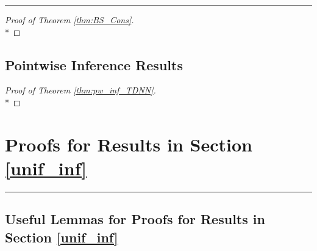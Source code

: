 \documentclass[letterpaper,10pt]{article}
\numberwithin{equation}{section}
\numberwithin{thm}{section}
\numberwithin{lem}{section}
\numberwithin{cor}{section}
\newcommand{\1}{\mathbbm{1}}
\begin{document}
\hrule

\begin{proof}[Proof of Theorem \ref{thm:BS_Cons}]\mbox{}\\*

\end{proof}

\newpage
\subsection{Pointwise Inference Results}

\begin{proof}[Proof of Theorem \ref{thm:pw_inf_TDNN}]\mbox{}\\*

\end{proof}

\newpage
\section{Proofs for Results in Section \ref{unif_inf}}
\hrule
\subsection{Useful Lemmas for Proofs for Results in Section \ref{unif_inf}}
\end{document}
